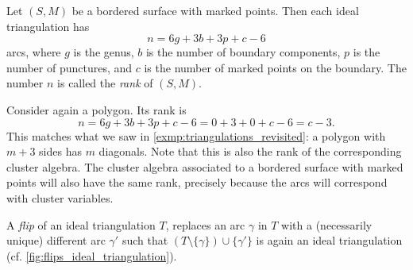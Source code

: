 \begin{proposition}\label{prop:rank_triangulation}

	Let $(S, M)$ be a bordered surface with marked points. Then each ideal triangulation
	has
	\begin{equation*}
		n = 6g + 3b + 3p + c -6
	\end{equation*}
	arcs, where $g$ is the genus, $b$ is the number of boundary components, $p$ is the number of punctures, and $c$ is the number of marked points on the boundary. The number $n$ is called the \emph{rank} of $(S, M)$.
\end{proposition}

Consider again a polygon. Its rank is
\begin{equation*}
	n = 6g + 3b + 3p + c - 6 = 0 + 3 + 0 + c - 6 = c - 3.
\end{equation*}
%
This matches what we saw in \cref{exmp:triangulations_revisited}: a polygon with $m +
	3$ sides has $m$ diagonals. Note that this is also the rank of the corresponding
cluster algebra. The cluster algebra associated to a bordered surface with marked
points will also have the same rank, precisely because the arcs will correspond with
cluster variables.

\begin{definition}

	A \emph{flip} of an ideal triangulation $T$, replaces an arc
	$\gamma$ in $T$ with a (necessarily unique) different arc $\gamma'$ such that $(T
		\setminus \{\gamma\}) \cup \{\gamma'\}$ is again an ideal triangulation (cf.
	\cref{fig:flips_ideal_triangulation}).
\end{definition}


